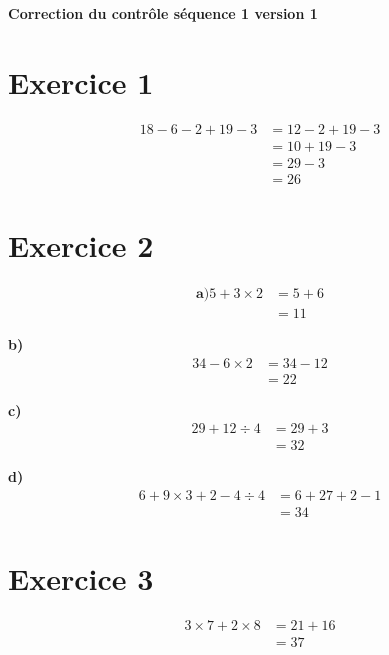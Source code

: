 \documentclass[12pt]{extarticle}
\begin{document}
\begin{center}
\Large\textbf{Correction du contrôle séquence 1 version 1}
\end{center}

\section*{Exercice 1}
\begin{align*}
18 - 6 - 2 + 19 - 3 &= 12 - 2 + 19 - 3 \\
                     &= 10 + 19 - 3 \\
                     &= 29 - 3 \\
                     &= 26
\end{align*}

\section*{Exercice 2}

\begin{align*}
\textbf{a)}
5 + 3 \times 2 &= 5 + 6 \\
               &= 11
\end{align*}

\textbf{b)}
\begin{align*}
34 - 6 \times 2 &= 34 - 12 \\
                &= 22
\end{align*}

\textbf{c)}
\begin{align*}
29 + 12 \div 4 &= 29 + 3 \\
               &= 32
\end{align*}

\textbf{d)}
\begin{align*}
6 + 9 \times 3 + 2 - 4 \div 4 &= 6 + 27 + 2 - 1 \\
                              &= 34
\end{align*}

\section*{Exercice 3}
\begin{align*}
3 \times 7 + 2 \times 8 &= 21 + 16 \\
                        &= 37
\end{align*}
\end{document}

